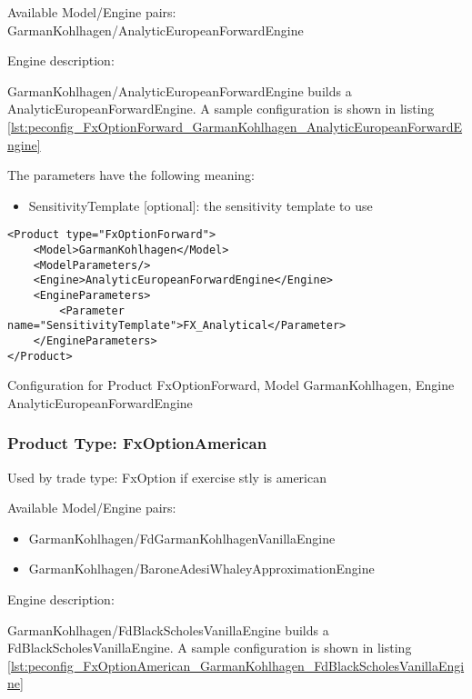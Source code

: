 Available Model/Engine pairs: GarmanKohlhagen/AnalyticEuropeanForwardEngine

Engine description:

GarmanKohlhagen/AnalyticEuropeanForwardEngine builds a AnalyticEuropeanForwardEngine. A sample configuration is shown in listing
\ref{lst:peconfig_FxOptionForward_GarmanKohlhagen_AnalyticEuropeanForwardEngine}

The parameters have the following meaning:

\begin{itemize}
\item SensitivityTemplate [optional]: the sensitivity template to use
\end{itemize}

\begin{longlisting}
\begin{verbatim}
<Product type="FxOptionForward">
    <Model>GarmanKohlhagen</Model>
    <ModelParameters/>
    <Engine>AnalyticEuropeanForwardEngine</Engine>
    <EngineParameters>
        <Parameter name="SensitivityTemplate">FX_Analytical</Parameter>
    </EngineParameters>
</Product>
\end{verbatim}
\caption{Configuration for Product FxOptionForward, Model GarmanKohlhagen, Engine AnalyticEuropeanForwardEngine}
\label{lst:peconfig_FxOptionForward_GarmanKohlhagen_AnalyticEuropeanForwardEngine}
\end{longlisting}

\subsubsection{Product Type: FxOptionAmerican}

Used by trade type: FxOption if exercise stly is american

Available Model/Engine pairs:

\begin{itemize}
\item GarmanKohlhagen/FdGarmanKohlhagenVanillaEngine
\item GarmanKohlhagen/BaroneAdesiWhaleyApproximationEngine
\end{itemize}

Engine description:

GarmanKohlhagen/FdBlackScholesVanillaEngine builds a FdBlackScholesVanillaEngine. A sample configuration is shown in listing
\ref{lst:peconfig_FxOptionAmerican_GarmanKohlhagen_FdBlackScholesVanillaEngine}

